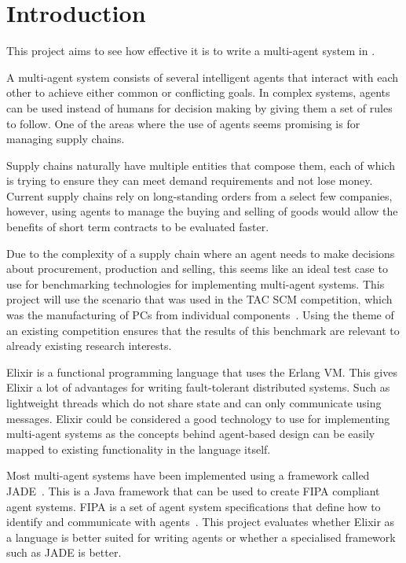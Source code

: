 \section{Introduction}

This project aims to see how effective it is to write a multi-agent system in .

A multi-agent system consists of several intelligent agents that interact with each other to achieve either common or conflicting goals.
In complex systems, agents can be used instead of humans for decision making by giving them a set of rules to follow.
One of the areas where the use of agents seems promising is for managing supply chains.

Supply chains naturally have multiple entities that compose them, each of which is trying to ensure they can meet demand requirements and not lose money.
Current supply chains rely on long-standing orders from a select few companies, however, using agents to manage the buying and selling of goods would allow the benefits of short term contracts to be evaluated faster.

Due to the complexity of a supply chain where an agent needs to make decisions about procurement, production and selling, this seems like an ideal test case to use for benchmarking technologies for implementing multi-agent systems.
This project will use the scenario that was used in the TAC SCM competition, which was the manufacturing of PCs from individual components~\cite{sadeh2003tac}.
Using the theme of an existing competition ensures that the results of this benchmark are relevant to already existing research interests.

Elixir is a functional programming language that uses the Erlang VM\@.
This gives Elixir a lot of advantages for writing fault-tolerant distributed systems.
Such as lightweight threads which do not share state and can only communicate using messages.
Elixir could be considered a good technology to use for implementing multi-agent systems as the concepts behind agent-based design can be easily mapped to existing functionality in the language itself.

Most multi-agent systems have been implemented using a framework called JADE~\cite{bellifemine1999jade}.
This is a Java framework that can be used to create FIPA compliant agent systems.
FIPA is a set of agent system specifications that define how to identify and communicate with agents~\cite{obrien1998fipa}.
This project evaluates whether Elixir as a language is better suited for writing agents or whether a specialised framework such as JADE is better.

